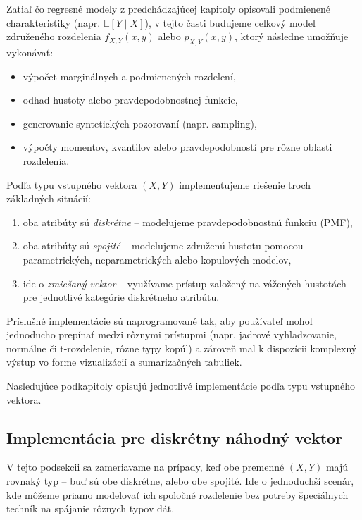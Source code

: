 Zatiaľ čo regresné modely z predchádzajúcej kapitoly opisovali podmienené charakteristiky (napr. $\mathbb{E}[Y \mid X]$), v tejto časti budujeme celkový model združeného rozdelenia $f_{X,Y}(x, y)$ alebo $p_{X,Y}(x, y)$, ktorý následne umožňuje vykonávať:

\begin{itemize}
\setlength{\itemsep}{0pt}
  \setlength{\parskip}{0pt}
  \item výpočet marginálnych a podmienených rozdelení,
  \item odhad hustoty alebo pravdepodobnostnej funkcie,
  \item generovanie syntetických pozorovaní (napr. sampling),
  \item výpočty momentov, kvantilov alebo pravdepodobností pre rôzne oblasti rozdelenia.
\end{itemize}

Podľa typu vstupného vektora $(X, Y)$ implementujeme riešenie troch základných situácií:

\begin{enumerate}
\setlength{\itemsep}{0pt}
  \setlength{\parskip}{0pt}
  \item oba atribúty sú \textit{diskrétne} – modelujeme pravdepodobnostnú funkciu (PMF),
  \item oba atribúty sú \textit{spojité} – modelujeme združenú hustotu pomocou parametrických, neparametrických alebo kopulových modelov,
  \item ide o \textit{zmiešaný vektor} – využívame prístup založený na vážených hustotách pre jednotlivé kategórie diskrétneho atribútu.
\end{enumerate}

Príslušné implementácie sú naprogramované tak, aby používateľ mohol jednoducho prepínať medzi rôznymi prístupmi (napr. jadrové vyhladzovanie, normálne či t-rozdelenie, rôzne typy kopúl) a zároveň mal k dispozícii komplexný výstup vo forme vizualizácií a sumarizačných tabuliek.

Nasledujúce podkapitoly opisujú jednotlivé implementácie podľa typu vstupného vektora.

\subsection{Implementácia pre diskrétny náhodný vektor}\label{subsec:homo_vector_implementation}

V tejto podsekcii sa zameriavame na prípady, keď obe premenné $(X, Y)$ majú rovnaký typ – buď sú obe diskrétne, alebo obe spojité. Ide o jednoduchší scenár, kde môžeme priamo modelovať ich spoločné rozdelenie bez potreby špeciálnych techník na spájanie rôznych typov dát.

